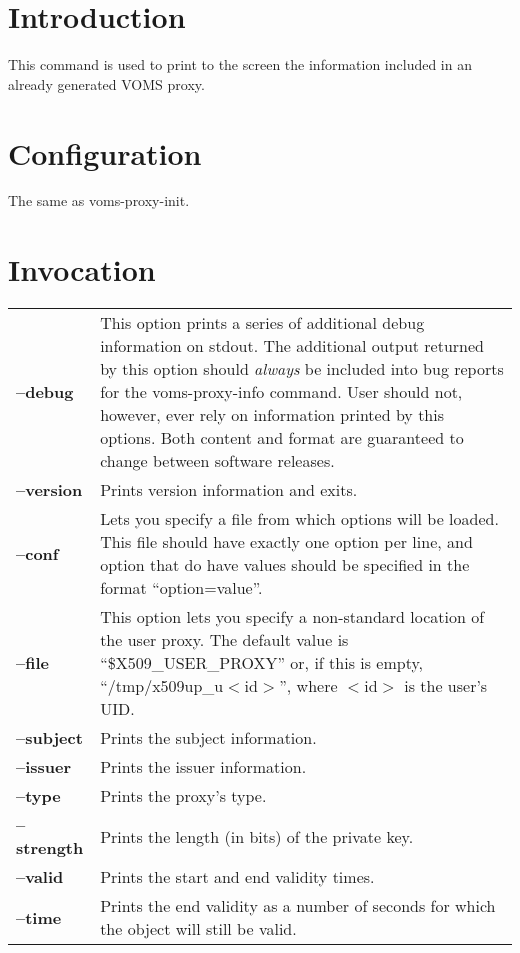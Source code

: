 \documentclass[a4paper]{book}
\begin{document}
\section{Introduction}
This command is used to print to the screen the information included
in an already generated VOMS proxy.

\section{Configuration}
The same as voms-proxy-init.

\section{Invocation}
\begin{longtable}{lp{3in}}
\textbf{--debug}    & This option prints a series of additional debug
		      information on stdout.  The additional output
		      returned by this option should \emph{always} be
		      included into bug reports for the
		      voms-proxy-info command.  User should not,
		      however, ever rely on information printed by
		      this options.  Both content and format are
		      guaranteed to change between software
		      releases.\\
\textbf{--version}  & Prints version information and exits.\\
\textbf{--conf}     & Lets you specify a file from which options will
		      be loaded.  This file should have exactly one
		      option per line, and option that do have values
		      should be specified in the format
		      ``option=value''.\\ 
\textbf{--file}     & This option lets you specify a non-standard
		      location of the user proxy.  The default value
		      is ``\$X509\_USER\_PROXY'' or, if this is empty,
		      ``/tmp/x509up\_u$<$id$>$'', where $<$id$>$ is
		      the user's UID.\\
\textbf{--subject}  & Prints the subject information.\\
\textbf{--issuer}   & Prints the issuer information.\\
\textbf{--type}     & Prints the proxy's type.\\
\textbf{--strength} & Prints the length (in bits) of the private
		      key.\\
\textbf{--valid}    & Prints the start and end validity times.\\
\textbf{--time}     & Prints the end validity as a number of seconds
		      for which the object will still be valid.\\

\end{longtable}
\end{document}
